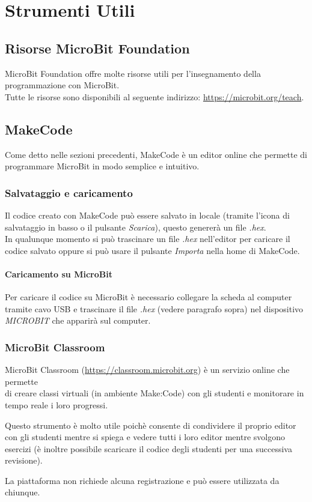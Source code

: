 \documentclass[../../docenti.tex]{subfiles}
\begin{document}
\section{Strumenti Utili}

\subsection{Risorse MicroBit Foundation}
MicroBit Foundation offre molte risorse utili per l'insegnamento della programmazione con MicroBit.\\
Tutte le risorse sono disponibili al seguente indirizzo: \url{https://microbit.org/teach}.

\subsection{MakeCode}
Come detto nelle sezioni precedenti, MakeCode è un editor online che permette di programmare MicroBit in modo semplice e intuitivo.

\subsubsection{Salvataggio e caricamento}
\label{sec:makecode_save_load}
Il codice creato con MakeCode può essere salvato in locale (tramite l'icona di salvataggio in basso o il pulsante \textit{Scarica}), questo genererà un file \textit{.hex}.\\
In qualunque momento si può trascinare un file \textit{.hex} nell'editor per caricare il codice salvato oppure si può usare il pulsante \textit{Importa} nella home di MakeCode.

\paragraph{Caricamento su MicroBit}
Per caricare il codice su MicroBit è necessario collegare la scheda al computer tramite cavo USB e trascinare il file \textit{.hex} (vedere paragrafo sopra) nel dispositivo \textit{MICROBIT} che apparirà sul computer.

\subsubsection{MicroBit Classroom}
MicroBit Classroom (\url{https://classroom.microbit.org}) è un servizio online che permette\\ di creare classi virtuali (in ambiente Make:Code) con gli studenti e monitorare in tempo reale i loro progressi.

Questo strumento è molto utile poichè consente di condividere il proprio editor con gli studenti mentre si spiega e vedere tutti i loro editor mentre svolgono esercizi (è inoltre possibile scaricare il codice degli studenti per una successiva revisione).

La piattaforma non richiede alcuna registrazione e può essere utilizzata da chiunque.
\end{document}
